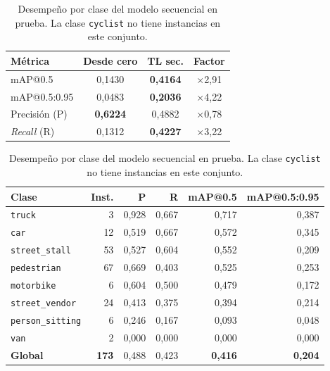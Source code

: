 \documentclass[10pt,a4paper]{article}
\begin{document}
\begin{table}[H]
\centering\footnotesize
\begin{minipage}[t]{0.395\textwidth}
\centering
\caption{Métricas globales sobre el conjunto de prueba (21 imágenes, 173 instancias).}
\label{tab:test}
\begin{tabular}{@{}lccc@{}}
\toprule
\textbf{Métrica} & \textbf{Desde cero} & \textbf{TL sec.} & \textbf{Factor}\\
\midrule
mAP@0.5      & 0{,}1430 & \textbf{0{,}4164} & $\times$2{,}91\\
mAP@0.5:0.95 & 0{,}0483 & \textbf{0{,}2036} & $\times$4{,}22\\
Precisión (P)& \textbf{0{,}6224} & 0{,}4882 & $\times$0{,}78\\
\emph{Recall} (R) & 0{,}1312 & \textbf{0{,}4227} & $\times$3{,}22\\
\bottomrule
\end{tabular}
\end{minipage}\hfill
\begin{minipage}[t]{0.575\textwidth}
\centering\setlength{\tabcolsep}{4.5pt}
\caption{Desempeño por clase del modelo secuencial en prueba. La clase \texttt{cyclist}
no tiene instancias en este conjunto.}
\label{tab:clases}
\begin{tabular}{@{}lrrrrr@{}}
\toprule
\textbf{Clase} & \textbf{Inst.} & \textbf{P} & \textbf{R} & \textbf{mAP@0.5} & \textbf{mAP@0.5:0.95}\\
\midrule
\texttt{truck}          &  3 & 0{,}928 & 0{,}667 & 0{,}717 & 0{,}387\\
\texttt{car}            & 12 & 0{,}519 & 0{,}667 & 0{,}572 & 0{,}345\\
\texttt{street\_stall}  & 53 & 0{,}527 & 0{,}604 & 0{,}552 & 0{,}209\\
\texttt{pedestrian}     & 67 & 0{,}669 & 0{,}403 & 0{,}525 & 0{,}253\\
\texttt{motorbike}      &  6 & 0{,}604 & 0{,}500 & 0{,}479 & 0{,}172\\
\texttt{street\_vendor} & 24 & 0{,}413 & 0{,}375 & 0{,}394 & 0{,}214\\
\texttt{person\_sitting}&  6 & 0{,}246 & 0{,}167 & 0{,}093 & 0{,}048\\
\texttt{van}            &  2 & 0{,}000 & 0{,}000 & 0{,}000 & 0{,}000\\
\midrule
\textbf{Global} & \textbf{173} & 0{,}488 & 0{,}423 & \textbf{0{,}416} & \textbf{0{,}204}\\
\bottomrule
\end{tabular}
\end{minipage}
\end{table}
\end{document}
